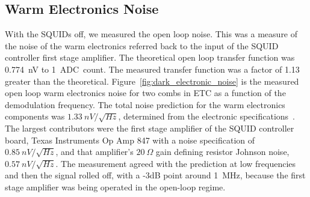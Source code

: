 


\subsection{Warm Electronics Noise}
\label{sec:warm_electronics}


With the \ac{SQUID}s off, we measured the open loop noise.
This was a measure of the noise of the warm electronics referred back to the input of the \ac{SQUID} controller first stage amplifier. 
The theoretical open loop transfer function was 0.774~nV to 1~\ac{ADC}~count. 
The measured transfer function was a factor of 1.13 greater than the theoretical. 
Figure~\ref{fig:dark_electronic_noise} is the measured open loop warm electronics noise for two combs in \ac{ETC} as a function of the demodulation frequency. 
The total noise prediction for the warm electronics components was $1.33~nV/\sqrt{Hz}$, determined from the electronic specifications~\cite{Francois2012}. 
The largest contributors were the first stage amplifier of the \ac{SQUID} controller board, Texas Instruments Op Amp 847 with a noise specification of $0.85~nV/\sqrt{Hz}$, and that amplifier's $20~\Omega$ gain defining resistor Johnson noise, $0.57~nV/\sqrt{Hz}$. 
The measurement agreed with the prediction at low frequencies and then the signal rolled off, with a -3dB point around 1~MHz, because the first stage amplifier was being operated in the open-loop regime.

